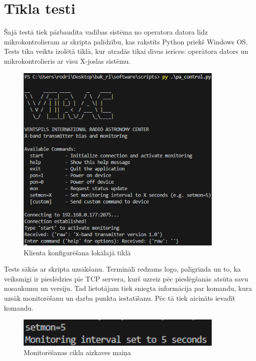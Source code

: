 \section{Tīkla testi}
Šajā testā tiek pārbaudīta vadības sistēma no operatora datora līdz mikrokontrolieram ar skripta palīdzību, kas rakstīts Python priekš Windows OS. Tests tika veikts izolētā tīklā, kur atradās tikai divas ierīces: operātora dators un mikrokontrolieris ar visu X-joslas sistēmu.
\begin{figure}[H]
	\centering
    \includegraphics[width=0.9\textwidth]{pictures/script_start.png}\hspace{1cm}
    \caption{Klienta konfigurēšana lokālajā tīklā}
\end{figure}
Tests sākās ar skripta uzsākšanu. Terminālī redzams logo, palīgrinda un to, ka veiksmīgi ir pieslēdzies pie TCP servera, kurš uzreiz pēc pieslēgšanās atsūta savu nosaukumu un versiju. Tad lietotājam tiek sniegta informācija par komandu, kura uzsāk monitorēšanu un darba punkta iestatīšanu. Pēc tā tiek aicināts ievadīt komandu.
\begin{figure}[H]
	\centering
    \includegraphics[width=0.9\textwidth]{pictures/script_monchange.png}\hspace{1cm}
    \caption{Monitorēšanas cikla aizkaves maiņa}
\end{figure}
